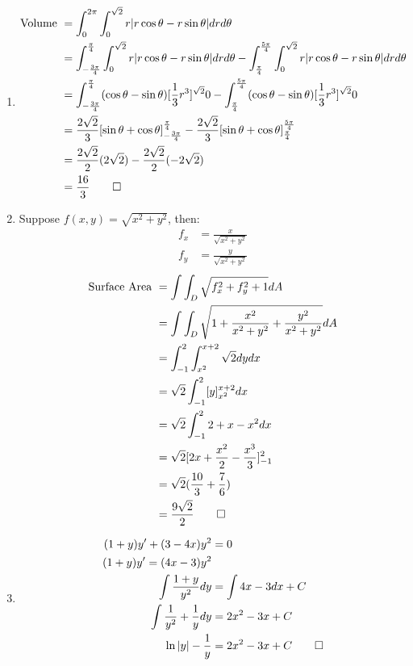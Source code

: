 \documentclass[12pt, a4paper]{article}
\begin{document}
\begin{enumerate}[Q\arabic*.]
  \item 
    \begin{align*}
      \text{Volume } &= \int^{2\pi}_0 \int^{\sqrt{2}}_0 r|r\cos\theta -r\sin\theta| drd\theta\\
                     &= \int^{\frac{\pi}{4}}_{-\frac{3\pi}{4}} \int^{\sqrt{2}}_0 r|r\cos\theta -r\sin\theta| drd\theta - \int^{\frac{5\pi}{4}}_{\frac{\pi}{4}} \int^{\sqrt{2}}_0 r|r\cos\theta -r\sin\theta| drd\theta\\
                     &= \int^{\frac{\pi}{4}}_{-\frac{3\pi}{4}}(\cos\theta - \sin\theta)[\frac{1}{3}r^3]^{\sqrt{2}}0 - \int^{\frac{5\pi}{4}}_{\frac{\pi}{4}}(\cos\theta - \sin\theta)[\frac{1}{3}r^3]^{\sqrt{2}}0\\
                     &= \frac{2\sqrt{2}}{3}[\sin\theta + \cos\theta]^{\frac{\pi}{4}}_{-\frac{3\pi}{4}} - \frac{2\sqrt{2}}{3}[\sin\theta + \cos\theta]^{\frac{5\pi}{4}}_{\frac{\pi}{4}}\\
                     &= \frac{2\sqrt{2}}{2}(2\sqrt{2}) - \frac{2\sqrt{2}}{2}(-2\sqrt{2})\\
                     &= \frac{16}{3} \qed
    \end{align*}

  \item Suppose $f(x, y) = \sqrt{x^2+y^2}$, then:
    \begin{align*}
      f_x &= \frac{x}{\sqrt{x^2+y^2}}\\
      f_y &= \frac{y}{\sqrt{x^2+y^2}}
    \end{align*}
    \begin{align*}
      \text{Surface Area } &= \int\int_D \sqrt{f_x^2 + f_y^2 + 1}dA\\
                           &= \int\int_D \sqrt{1+\frac{x^2}{x^2+y^2} + \frac{y^2}{x^2+y^2}} dA\\
                           &= \int^2_{-1} \int^{x+2}_{x^2} \sqrt{2} dydx\\
                           &= \sqrt{2} \int^2_{-1} [y]^{x+2}_{x^2} dx\\
                           &= \sqrt{2} \int^2_{-1} 2+x-x^2 dx\\
                           &= \sqrt{2}[2x+\frac{x^2}{2}-\frac{x^3}{3}]^2_{-1}\\
                           &= \sqrt{2}(\frac{10}{3} + \frac{7}{6})\\
                           &= \frac{9\sqrt{2}}{2} \qed
    \end{align*}

  \item 
    \begin{align*}
      (1+y)y' + (3-4x)y^2 &= 0\\
      (1+y)y' = (4x-3)y^2\\
      \int \frac{1+y}{y^2} dy &= \int 4x -3 dx + C\\
      \int \frac{1}{y^2} + \frac{1}{y} dy &= 2x^2 - 3x + C\\
      \ln|y| - \frac{1}{y} &= 2x^2-3x+C\qed
    \end{align*}
\end{enumerate}
\end{document}
